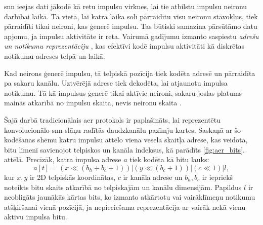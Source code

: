 

\Gls{snn} ieejas dati jākodē kā retu impulsu virknes, lai tie atbilstu impulsu neironu darbībai laikā. Tā vietā, lai
katrā laika solī pārraidītu visu neironu stāvokļus, tiek pārraidīti tikai neironi, kas ģenerē impulsu. Tas būtiski
samazina pārsūtāmo datu apjomu, ja impulsu aktivitāte ir reta. Vairumā gadījumu izmanto saspiestu \textit{adrešu un notikumu
reprezentāciju} 
\cite{sommer2022, plagwitz2025}, kas efektīvi kodē impulsu aktivitāti kā diskrētas notikumu adreses telpā un laikā.

Kad neirons ģenerē impulsu, tā telpiskā pozīcija tiek kodēta adresē un pārraidīta pa sakaru kanālu. Uztvērējā adrese tiek
dekodēta, lai atjaunotu impulsa notikumu. Tā kā impulsus ģenerē tikai aktīvie neironi, sakaru joslas platums mainās atkarībā
no impulsu skaita, nevis neironu skaita \cite{purohit2022}.


Šajā darbā tradicionālais \Gls{aer} protokols ir paplašināts, lai reprezentētu konvolucionālo \Gls{snn} slāņu radītās daudzkanālu pazīmju kartes. Saskaņā ar šo kodēšanas shēmu katru impulsu attēlo viena vesela skaitļa adrese, kas veidota, bitu līmenī savienojot telpiskos un kanāla indeksus, kā parādīts \ref{fig:aer_bits}. attēlā. Precīzāk, katra impulsa adrese \(a\) tiek kodēta kā bitu lauks:
\begin{equation}
    a[t] = (x \ll (b_h + b_c + 1)) | (y \ll (b_c + 1)) | (c \ll 1) | l,
\end{equation}
kur \(x, y\) ir 2D telpiskās koordinātas, \(c\) ir kanāla adrese un \(b_h, b_c\) ir iepriekš noteikts bitu skaits atkarībā no telpiskajām un kanālu dimensijām. Papildus \(l\) ir neobligāts jaunākās kārtas bits, ko izmanto atkārtotu vai vairāklīmeņu notikumu atšķiršanai vienā pozīcijā, ja nepieciešama reprezentācija ar vairāk nekā vienu aktīvu impulsa bitu.

